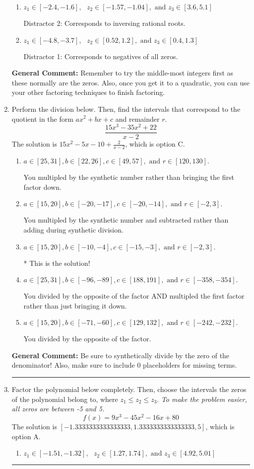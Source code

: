 \documentclass{extbook}[14pt]
\newcommand{\litem}[1]{\item #1

\rule{\textwidth}{0.4pt}}
\begin{document}
\begin{enumerate}
{\begin{enumerate}[label=\Alph*.]
 Distractor 4: Corresponds to moving factors from one rational to another.
\item \( z_1 \in [-2.4, -1.6], \text{   }  z_2 \in [-1.57, -1.04], \text{   and   } z_3 \in [3.6, 5.1] \)

 Distractor 2: Corresponds to inversing rational roots.
\item \( z_1 \in [-4.8, -3.7], \text{   }  z_2 \in [0.52, 1.2], \text{   and   } z_3 \in [0.4, 1.3] \)

 Distractor 1: Corresponds to negatives of all zeros.
\end{enumerate}

\textbf{General Comment:} Remember to try the middle-most integers first as these normally are the zeros. Also, once you get it to a quadratic, you can use your other factoring techniques to finish factoring.
}
\litem{
Perform the division below. Then, find the intervals that correspond to the quotient in the form $ax^2+bx+c$ and remainder $r$.
\[ \frac{15x^{3} -35 x^{2} + 22}{x -2} \]The solution is \( 15x^{2} -5 x -10 + \frac{2}{x -2} \), which is option C.\begin{enumerate}[label=\Alph*.]
\item \( a \in [25, 31], b \in [22, 26], c \in [49, 57], \text{ and } r \in [120, 130]. \)

 You multipled by the synthetic number rather than bringing the first factor down.
\item \( a \in [15, 20], b \in [-20, -17], c \in [-20, -14], \text{ and } r \in [-2, 3]. \)

 You multipled by the synthetic number and subtracted rather than adding during synthetic division.
\item \( a \in [15, 20], b \in [-10, -4], c \in [-15, -3], \text{ and } r \in [-2, 3]. \)

* This is the solution!
\item \( a \in [25, 31], b \in [-96, -89], c \in [188, 191], \text{ and } r \in [-358, -354]. \)

 You divided by the opposite of the factor AND multipled the first factor rather than just bringing it down.
\item \( a \in [15, 20], b \in [-71, -60], c \in [129, 132], \text{ and } r \in [-242, -232]. \)

 You divided by the opposite of the factor.
\end{enumerate}

\textbf{General Comment:} Be sure to synthetically divide by the zero of the denominator! Also, make sure to include 0 placeholders for missing terms.
}
\litem{
Factor the polynomial below completely. Then, choose the intervals the zeros of the polynomial belong to, where $z_1 \leq z_2 \leq z_3$. \textit{To make the problem easier, all zeros are between -5 and 5.}
\[ f(x) = 9x^{3} -45 x^{2} -16 x + 80 \]The solution is \( [-1.3333333333333333, 1.3333333333333333, 5] \), which is option A.\begin{enumerate}[label=\Alph*.]
\item \( z_1 \in [-1.51, -1.32], \text{   }  z_2 \in [1.27, 1.74], \text{   and   } z_3 \in [4.92, 5.01] \)


\end{enumerate}}
\end{enumerate}
\end{document}
